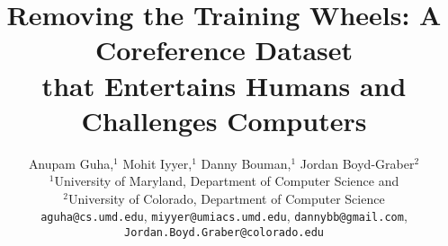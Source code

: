 \documentclass[11pt]{article}
\title{Removing the Training Wheels:  A Coreference Dataset \\ that
  Entertains Humans and Challenges Computers}
\author{
  Anupam Guha,$^{1}$ Mohit Iyyer,$^{1}$ Danny Bouman,$^{1}$ Jordan Boyd-Graber$^{2}$\\
  $^1$University of Maryland, Department of Computer Science and \abr{umiacs}\\
  $^2$University of Colorado, Department of Computer Science \\
    {\tt aguha@cs.umd.edu}, {\tt miyyer@umiacs.umd.edu}, {\tt dannybb@gmail.com}, \\{\tt Jordan.Boyd.Graber@colorado.edu}\\
}
\begin{document}
\maketitle
\begin{abstract}

  

\end{abstract}











\clearpage




\footnotesize

\end{document}
